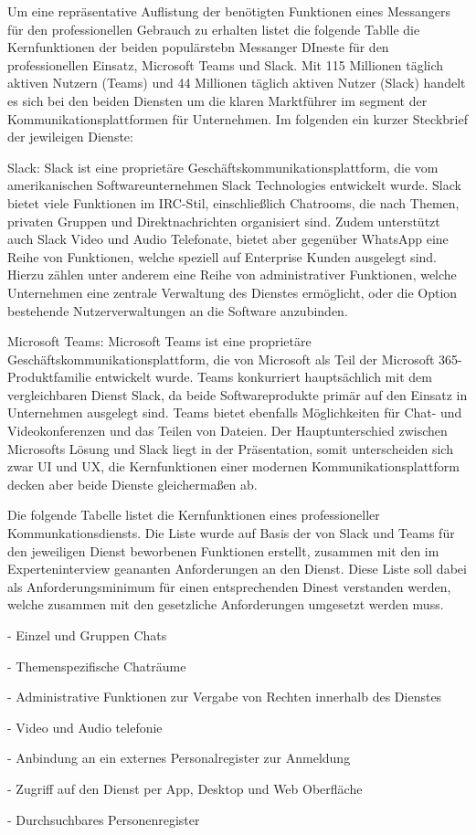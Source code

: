 Um eine repräsentative Auflistung der benötigten Funktionen eines Messangers für den professionellen Gebrauch zu erhalten listet die folgende Tablle die Kernfunktionen der beiden populärstebn Messanger DIneste für den professionellen Einsatz, Microsoft Teams und Slack.
Mit 115 Millionen täglich aktiven Nutzern (Teams) und 44 Millionen täglich aktiven Nutzer (Slack) handelt es sich bei den beiden Diensten um die klaren Marktführer im segment der Kommunikationsplattformen für Unternehmen. Im folgenden ein kurzer Steckbrief der jewileigen Dienste:

Slack: Slack ist eine proprietäre Geschäftskommunikationsplattform, die vom amerikanischen Softwareunternehmen Slack Technologies entwickelt wurde. Slack bietet viele Funktionen im IRC-Stil, einschließlich Chatrooms, die nach Themen, privaten Gruppen und Direktnachrichten organisiert sind. Zudem unterstützt auch Slack Video und Audio Telefonate, bietet aber gegenüber WhatsApp eine Reihe von Funktionen, welche speziell auf Enterprise Kunden ausgelegt sind. Hierzu zählen unter anderem eine Reihe von administrativer Funktionen, welche Unternehmen eine zentrale Verwaltung des Dienstes ermöglicht, oder die Option bestehende Nutzerverwaltungen an die Software anzubinden.

Microsoft Teams: Microsoft Teams ist eine proprietäre Geschäftskommunikationsplattform, die von Microsoft als Teil der Microsoft 365-Produktfamilie entwickelt wurde. Teams konkurriert hauptsächlich mit dem vergleichbaren Dienst Slack, da beide Softwareprodukte primär auf den Einsatz in Unternehmen ausgelegt sind. Teams bietet ebenfalls Möglichkeiten für Chat- und Videokonferenzen und das Teilen von Dateien. Der Hauptunterschied zwischen Microsofts Lösung und Slack liegt in der Präsentation, somit unterscheiden sich zwar UI und UX, die Kernfunktionen einer modernen Kommunikationsplattform decken aber beide Dienste gleichermaßen ab.

Die folgende Tabelle listet die Kernfunktionen eines professioneller Kommunkationsdiensts. Die Liste wurde auf Basis der von Slack und Teams für den jeweiligen Dienst beworbenen Funktionen erstellt, zusammen mit den im Experteninterview geananten Anforderungen an den Dienst. Diese Liste soll dabei als Anforderungsminimum für einen entsprechenden Dinest verstanden werden, welche zusammen mit den gesetzliche Anforderungen umgesetzt werden muss.

- Einzel und Gruppen Chats 

- Themenspezifische Chaträume

- Administrative Funktionen zur Vergabe von Rechten innerhalb des Dienstes 

- Video und Audio telefonie

- Anbindung an ein externes Personalregister zur Anmeldung

- Zugriff auf den Dienst per App, Desktop und Web Oberfläche

- Durchsuchbares Personenregister